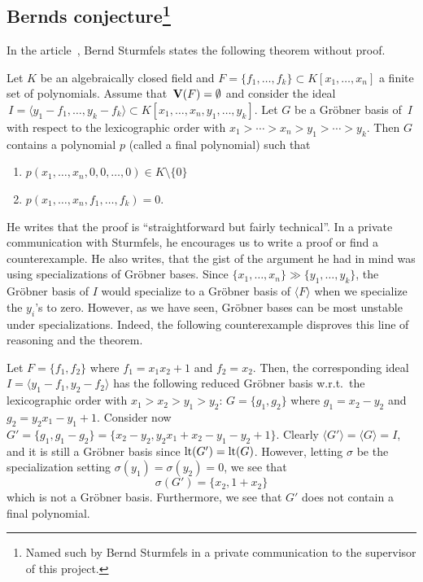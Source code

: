 \subsection[Bernds conjecture]{Bernds conjecture\footnote{Named such by Bernd Sturmfels in a private communication to the supervisor of this project.}}\label{sec:bernd}
In the article~\cite{sturmfels}, Bernd Sturmfels states the following theorem without proof.

\begin{theorem}
  Let $K$ be an algebraically closed field and $F = \{f_{1}, \dots, f_{k}\} \subset K[x_{1}, \dots, x_{n}]$ a finite set of polynomials. Assume that $\,\operatorname{\mathbf V}(F) = \emptyset$ and consider the ideal $\,I = \langle y_{1} - f_{1}, \dots, y_{k} - f_{k} \rangle \subset K[x_{1}, \dots, x_{n}, y_{1}, \dots, y_{k}]$. Let $G$ be a Gröbner basis of $\,I$ with respect to the lexicographic order with $x_{1} > \cdots > x_{n} > y_{1} > \cdots > y_{k}$. Then $G$ contains a polynomial $p$ (called a final polynomial) such that
  \begin{enumerate}
    \item $p(x_{1}, \dots, x_{n}, 0, 0, \dots, 0) \in K \setminus \{0\}$
    \item $p(x_{1}, \dots, x_{n}, f_{1}, \dots, f_{k}) = 0$.
  \end{enumerate}
\end{theorem}

He writes that the proof is ``straightforward but fairly technical''. In a private communication\cite{NL_to_BS} with Sturmfels, he encourages us to write a proof or find a counterexample. He also writes, that the gist of the argument he had in mind was using specializations of Gröbner bases. Since $\{x_{1}, \dots, x_{n}\} \gg \{y_{1}, \dots, y_{k}\}$, the Gröbner basis of $I$ would specialize to a Gröbner basis of $\langle F \rangle$ when we specialize the $y_{i}$'s to zero. However, as we have seen, Gröbner bases can be most unstable under specializations. Indeed, the following counterexample disproves this line of reasoning and the theorem.

\begin{example}\upshape
  Let $F = \{f_{1}, f_{2}\}$ where $f_{1} = x_{1} x_{2} + 1$ and $f_{2} = x_{2}$. Then, the corresponding ideal
  $I = \langle y_{1} - f_{1}, y_{2} - f_{2} \rangle$ has the following reduced Gröbner basis w.r.t.\ the lexicographic order with $x_{1} > x_{2} > y_{1} > y_{2}$: $G =  \{g_{1}, g_{2}\}$ where $g_{1} = x_{2} - y_{2}$ and $ g_{2} = y_{2}x_{1} - y_{1} + 1$. Consider now $G' = \{g_{1}, g_{1} - g_{2}\} = \{x_{2} - y_{2}, y_{2}x_{1} + x_{2} - y_{1} - y_{2} + 1\}$. Clearly $\langle G' \rangle = \langle G \rangle = I$, and it is still a Gröbner basis since $\operatorname{lt}(G') = \operatorname{lt}(G)$. However, letting $\sigma$ be the specialization setting $\sigma(y_{1}) = \sigma(y_{2}) = 0$, we see that
  \[\sigma(G') = \{x_{2}, 1+x_{2}\}\]
  which is not a Gröbner basis. Furthermore, we see that $G'$ does not contain a final polynomial.
\end{example}

